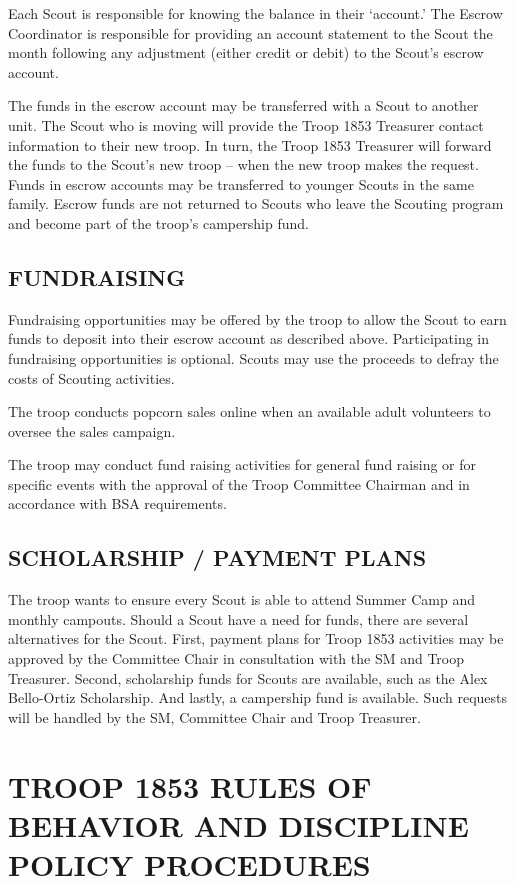 \documentclass{ltxguide}
\begin{document}
Each Scout is responsible for knowing the balance in their ‘account.' The Escrow Coordinator is responsible for providing an account statement to the Scout the month following any adjustment (either credit or debit) to the Scout's escrow account.

The funds in the escrow account may be transferred with a Scout to another unit. The Scout who is moving will provide the Troop 1853 Treasurer contact information to their new troop. In turn, the Troop 1853 Treasurer will forward the funds to the Scout's new troop – when the new troop makes the request. Funds in escrow accounts may be transferred to younger Scouts in the same family. Escrow funds are not returned to Scouts who leave the Scouting program and become part of the troop's campership fund.

\subsection{FUNDRAISING}
Fundraising opportunities may be offered by the troop to allow the Scout to earn funds to deposit into their escrow account as described above. Participating in fundraising opportunities is optional. Scouts may use the proceeds to defray the costs of Scouting activities.

The troop conducts popcorn sales online when an available adult volunteers to oversee the sales campaign. 

The troop may conduct fund raising activities for general fund raising or for specific events with the approval of the Troop Committee Chairman and in accordance with \ac{BSA} requirements.

\subsection{SCHOLARSHIP / PAYMENT PLANS}
The troop wants to ensure every Scout is able to attend Summer Camp and monthly campouts. Should a Scout have a need for funds, there are several alternatives for the Scout. First, payment plans for Troop 1853 activities may be approved by the Committee Chair in consultation with the \ac{SM} and Troop Treasurer. Second, scholarship funds for Scouts are available, such as the Alex Bello-Ortiz Scholarship. And lastly, a campership fund is available. Such requests will be handled by the \ac{SM}, Committee Chair and Troop Treasurer.

\section{TROOP 1853 RULES OF BEHAVIOR AND DISCIPLINE POLICY PROCEDURES}
\end{document}
